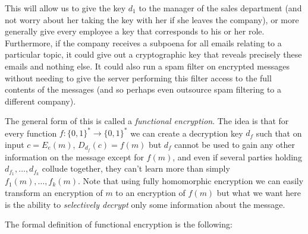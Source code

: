 This will allow us to give the key \(d_1\) to the manager of the sales
department (and not worry about her taking the key with her if she
leaves the company), or more generally give every employee a key that
corresponds to his or her role. Furthermore, if the company receives a
subpoena for all emails relating to a particular topic, it could give
out a cryptographic key that reveals precisely these emails and nothing
else. It could also run a spam filter on encrypted messages without
needing to give the server performing this filter access to the full
contents of the messages (and so perhaps even outsource spam filtering
to a different company).

The general form of this is called a \emph{functional encryption}. The
idea is that for every function \(f:\{0,1\}^*\rightarrow\{0,1\}^*\) we
can create a decryption key \(d_f\) such that on input \(c= E_e(m)\),
\(D_{d_f}(c)=f(m)\) but \(d_f\) cannot be used to gain any other
information on the message except for \(f(m)\), and even if several
parties holding \(d_{f_1},\ldots,d_{f_k}\) collude together, they can't
learn more than simply \(f_1(m),\ldots,f_k(m)\). Note that using fully
homomorphic encryption we can easily transform an encryption of \(m\) to
an encryption of \(f(m)\) but what we want here is the ability to
\emph{selectively decrypt} only some information about the message.

The formal definition of functional encryption is the following:

